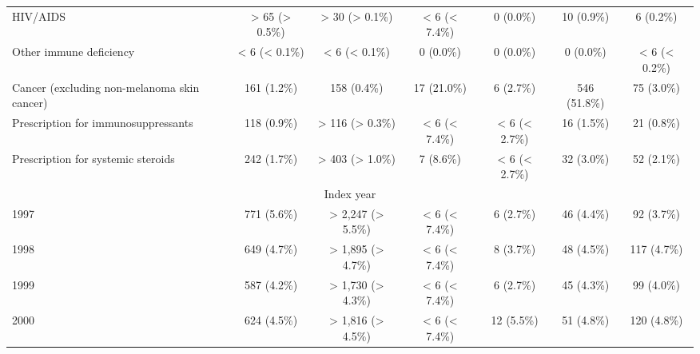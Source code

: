 \documentclass{article}
\begin{document}
\begin{table}[htbp]
\begin{longtable}{l*{6}{c}}
HIV/AIDS                                                &          > 65 (> 0.5\%)         &          > 30 (> 0.1\%)         &          < 6 (< 7.4\%)          &            0 (0.0\%)            &            10 (0.9\%)           &            6 (0.2\%)            \\
Other immune deficiency                                 &          < 6 (< 0.1\%)          &          < 6 (< 0.1\%)          &            0 (0.0\%)            &            0 (0.0\%)            &            0 (0.0\%)            &          < 6 (< 0.2\%)          \\
Cancer (excluding non-melanoma skin cancer)             &           161 (1.2\%)           &           158 (0.4\%)           &           17 (21.0\%)           &            6 (2.7\%)            &           546 (51.8\%)          &            75 (3.0\%)           \\
Prescription for immunosuppressants                     &           118 (0.9\%)           &         > 116 (> 0.3\%)         &          < 6 (< 7.4\%)          &          < 6 (< 2.7\%)          &            16 (1.5\%)           &            21 (0.8\%)           \\
Prescription for systemic steroids                      &           242 (1.7\%)           &         > 403 (> 1.0\%)         &            7 (8.6\%)            &          < 6 (< 2.7\%)          &            32 (3.0\%)           &            52 (2.1\%)           \\
\multicolumn{7}{c}{Index year                                              }\\
  1997                                                  &           771 (5.6\%)           &        > 2,247 (> 5.5\%)        &          < 6 (< 7.4\%)          &            6 (2.7\%)            &            46 (4.4\%)           &            92 (3.7\%)           \\
  1998                                                  &           649 (4.7\%)           &        > 1,895 (> 4.7\%)        &          < 6 (< 7.4\%)          &            8 (3.7\%)            &            48 (4.5\%)           &           117 (4.7\%)           \\
  1999                                                  &           587 (4.2\%)           &        > 1,730 (> 4.3\%)        &          < 6 (< 7.4\%)          &            6 (2.7\%)            &            45 (4.3\%)           &            99 (4.0\%)           \\
  2000                                                  &           624 (4.5\%)           &        > 1,816 (> 4.5\%)        &          < 6 (< 7.4\%)          &            12 (5.5\%)           &            51 (4.8\%)           &           120 (4.8\%)           \\

\end{longtable}
\end{table}
\end{document}
